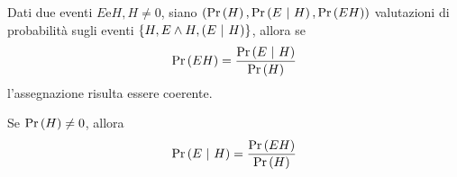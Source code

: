 \documentclass{subfiles}
\begin{document}
\begin{Theorem}
    Dati due eventi \(E \text{e} H, H \neq 0\), siano \((\Prob{H}, \Prob{E}[H], \Prob{EH})\) valutazioni di probabilità sugli eventi \(\Set{H, E \land H, (E \Given H)}\),
    allora se
    \[
        \Prob{EH} = \Frac{\Prob{E}[H]}{\Prob{H}}
    \]
    l'assegnazione risulta essere coerente.
\end{Theorem}
\begin{Corollary}
    Se \(\Prob{H} \neq 0\), allora
    \[
        \Prob{E}[H] = \Frac{\Prob{EH}}{\Prob{H}}
    \]
\end{Corollary}
\end{document}

